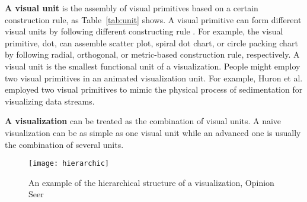 \textbf{A visual unit} is the assembly of visual primitives based on a certain construction rule, as Table~\ref{tab:unit} shows. 
A visual primitive can form different visual units by following different constructing rule . For example, the visual primitive, dot, can assemble  scatter plot, spiral dot chart, or circle packing chart by following radial, orthogonal, or metric-based construction rule, respectively.  A visual unit is the smallest functional unit of a visualization. 
 
People might employ two visual primitives in an animated visualization unit. For example, Huron et al.\cite{huron_visual_2013} employed two visual primitives to mimic the physical process of sedimentation for visualizing data streams. 

\textbf{A visualization} can be treated as the combination of visual units. A naive visualization can be as simple as one visual unit while an advanced one is usually the combination of several units. 

\begin{figure}
 \centering %
 \texttt{[image: hierarchic]}
 \caption{An example of the hierarchical structure of a visualization, Opinion Seer\cite{wu_opinionseer:_2010}}
 \label{fig:hierarchic}
\end{figure}

